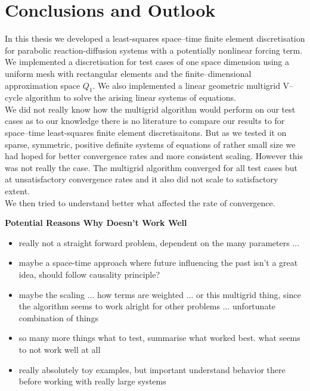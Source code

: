 \documentclass[../draft_1.tex]{subfiles}
\begin{document}
\chapter{Conclusions and Outlook}

In this thesis we developed a least-squares space--time finite element discretisation for parabolic reaction-diffusion systems with a potentially nonlinear forcing term. We implemented a discretisation for test cases of one space dimension using a uniform mesh with rectangular elements and the finite--dimensional approximation space $Q_1$. We also implemented a linear geometric multigrid V--cycle algorithm to solve the arising linear systems of equations. 
\\
We did not really know how the multigrid algorithm would perform on our test cases as to our knowledge there is no literature to compare our results to for space--time least-squares finite element discretisaitons. But as we tested it on sparse, symmetric, positive definite systems of equations of rather small size we had hoped for better convergence rates and more consistent scaling. However this was not really the case. The multigrid algorithm converged for all test cases but at unsatisfactory convergence rates and it also did not scale to satisfactory extent. 
\smallskip
\\
We then tried to understand better what affected the rate of convergence.  



\textbf{Potential Reasons Why Doesn't Work Well}



\begin{itemize}
	\item really not a straight forward problem, dependent on the many parameters ... 
	\item maybe a space-time approach where future influencing the past isn't a great idea, should follow causality principle? 
	\item maybe the scaling ... how terms are weighted ... or this multigrid thing, since the algorithm seems to work alright for other problems ... unfortunate combination of things
	\item so many more things what to test, summarise what worked best. what seems to not work well at all
	\item really absolutely toy examples, but important understand behavior there before working with really large systems
	
\end{itemize}
\end{document}
